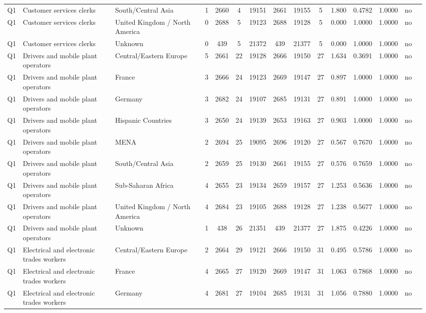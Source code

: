 \begin{longtable}{lllrcccccccccll}
Q1 & Customer services clerks & South/Central Asia & 1 & 2660 & 4 & 19151 & 2661 & 19155 & 5 & 1.800 & 0.4782 & 1.0000 & no \\
Q1 & Customer services clerks & United Kingdom / North America & 0 & 2688 & 5 & 19123 & 2688 & 19128 & 5 & 0.000 & 1.0000 & 1.0000 & no \\
Q1 & Customer services clerks & Unknown & 0 & 439 & 5 & 21372 & 439 & 21377 & 5 & 0.000 & 1.0000 & 1.0000 & no \\
Q1 & Drivers and mobile plant operators & Central/Eastern Europe & 5 & 2661 & 22 & 19128 & 2666 & 19150 & 27 & 1.634 & 0.3691 & 1.0000 & no \\
Q1 & Drivers and mobile plant operators & France & 3 & 2666 & 24 & 19123 & 2669 & 19147 & 27 & 0.897 & 1.0000 & 1.0000 & no \\
Q1 & Drivers and mobile plant operators & Germany & 3 & 2682 & 24 & 19107 & 2685 & 19131 & 27 & 0.891 & 1.0000 & 1.0000 & no \\
Q1 & Drivers and mobile plant operators & Hispanic Countries & 3 & 2650 & 24 & 19139 & 2653 & 19163 & 27 & 0.903 & 1.0000 & 1.0000 & no \\
Q1 & Drivers and mobile plant operators & MENA & 2 & 2694 & 25 & 19095 & 2696 & 19120 & 27 & 0.567 & 0.7670 & 1.0000 & no \\
Q1 & Drivers and mobile plant operators & South/Central Asia & 2 & 2659 & 25 & 19130 & 2661 & 19155 & 27 & 0.576 & 0.7659 & 1.0000 & no \\
Q1 & Drivers and mobile plant operators & Sub-Saharan Africa & 4 & 2655 & 23 & 19134 & 2659 & 19157 & 27 & 1.253 & 0.5636 & 1.0000 & no \\
Q1 & Drivers and mobile plant operators & United Kingdom / North America & 4 & 2684 & 23 & 19105 & 2688 & 19128 & 27 & 1.238 & 0.5677 & 1.0000 & no \\
Q1 & Drivers and mobile plant operators & Unknown & 1 & 438 & 26 & 21351 & 439 & 21377 & 27 & 1.875 & 0.4226 & 1.0000 & no \\
Q1 & Electrical and electronic trades workers & Central/Eastern Europe & 2 & 2664 & 29 & 19121 & 2666 & 19150 & 31 & 0.495 & 0.5786 & 1.0000 & no \\
Q1 & Electrical and electronic trades workers & France & 4 & 2665 & 27 & 19120 & 2669 & 19147 & 31 & 1.063 & 0.7868 & 1.0000 & no \\
Q1 & Electrical and electronic trades workers & Germany & 4 & 2681 & 27 & 19104 & 2685 & 19131 & 31 & 1.056 & 0.7880 & 1.0000 & no \\

\end{longtable}
